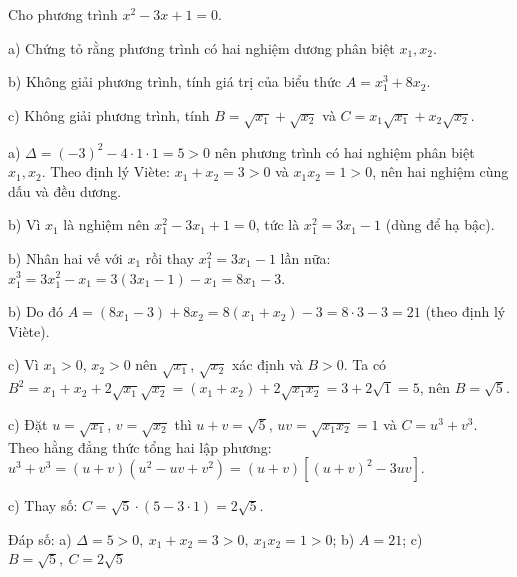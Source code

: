 \begin{problem}[9DS-PT2-024]
Cho phương trình $x^2 - 3x + 1 = 0$.

a) Chứng tỏ rằng phương trình có hai nghiệm dương phân biệt $x_1, x_2$.

b) Không giải phương trình, tính giá trị của biểu thức $A = x_1^3 + 8x_2$.

c) Không giải phương trình, tính $B = \sqrt{x_1} + \sqrt{x_2}$ và $C = x_1\sqrt{x_1} + x_2\sqrt{x_2}$.

\begin{solution}
a) $\Delta = (-3)^2 - 4 \cdot 1 \cdot 1 = 5 > 0$ nên phương trình có hai nghiệm phân biệt $x_1, x_2$. Theo định lý Viète: $x_1 + x_2 = 3 > 0$ và $x_1 x_2 = 1 > 0$, nên hai nghiệm cùng dấu và đều dương.

b) Vì $x_1$ là nghiệm nên $x_1^2 - 3x_1 + 1 = 0$, tức là $x_1^2 = 3x_1 - 1$ (dùng để hạ bậc).

b) Nhân hai vế với $x_1$ rồi thay $x_1^2 = 3x_1 - 1$ lần nữa: $x_1^3 = 3x_1^2 - x_1 = 3(3x_1 - 1) - x_1 = 8x_1 - 3$.

b) Do đó $A = (8x_1 - 3) + 8x_2 = 8(x_1 + x_2) - 3 = 8 \cdot 3 - 3 = 21$ (theo định lý Viète).

c) Vì $x_1 > 0$, $x_2 > 0$ nên $\sqrt{x_1}$, $\sqrt{x_2}$ xác định và $B > 0$. Ta có $B^2 = x_1 + x_2 + 2\sqrt{x_1}\sqrt{x_2} = (x_1 + x_2) + 2\sqrt{x_1 x_2} = 3 + 2\sqrt{1} = 5$, nên $B = \sqrt{5}$.

c) Đặt $u = \sqrt{x_1}$, $v = \sqrt{x_2}$ thì $u + v = \sqrt{5}$, $uv = \sqrt{x_1 x_2} = 1$ và $C = u^3 + v^3$. Theo hằng đẳng thức tổng hai lập phương: $u^3 + v^3 = (u + v)(u^2 - uv + v^2) = (u + v)[(u + v)^2 - 3uv]$.

c) Thay số: $C = \sqrt{5} \cdot (5 - 3 \cdot 1) = 2\sqrt{5}$.

Đáp số: a) $\boxed{\Delta = 5 > 0,\ x_1 + x_2 = 3 > 0,\ x_1 x_2 = 1 > 0}$; b) $\boxed{A = 21}$; c) $\boxed{B = \sqrt{5},\ C = 2\sqrt{5}}$
\end{solution}
\end{problem}

